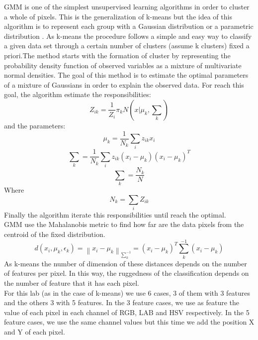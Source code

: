 \documentclass[10pt,twocolumn,letterpaper]{article}
\begin{document}
GMM is one of the simplest unsupervised learning algorithms in order to cluster a whole of pixels. This is the generalization of k-means but the idea of this algorithm is to represent each group with a Gaussian distribution or a parametric distribution \cite{Arbelaez}. As k-means the procedure follows a simple and easy way to classify a given data set through a certain number of clusters (assume k clusters) fixed a priori.The method starts with the formation of cluster by representing the probability density function of observed variables as a mixture of multivariate normal densities. The goal of this method is to estimate the optimal parameters of a mixture of Gaussians in order to explain the observed data. For reach this goal, the algorithm estimate the responsibilities:
\begin{equation} Z_{ik}= \frac{1}{Z_{i}}\pi _{k}N\left ( x|\mu _{k}, \sum _{k}\right ) 
\end{equation}
and the parameters:
\begin{equation} \mu _{k}=\frac{1}{N_{k}}\sum _{i}z_{ik}x_{i}
\end{equation}
\begin{equation}
\sum _{k}=\frac{1}{N_{k}}\sum _{i}z_{ik}\left (  x_{i}-\mu _{k}\right )\left (  x_{i}-\mu _{k}\right )^{T}
\end{equation}
\begin{equation}
\sum _{k}=\frac{N_{k}}{N}
\end{equation}
Where
\begin{equation}
N_{k}=\sum _{i}Z_{ik}
\end{equation}
Finally the algorithm iterate this responsibilities until reach the optimal. \\
GMM use the Mahalanobis metric to find how far are the data pixels from the centroid of the fixed distribution. 
\begin{equation}
d\left ( x_{i},\mu _{k} ,\epsilon _{k}\right) =\left \| x_{i}-\mu _{k} \right \|_{\sum _{k}^{-1}}=\left (  x_{i}-\mu _{k}\right )^{T}\sum _{k}^{-1}\left (  x_{i}-\mu _{k}\right )
\end{equation}
As k-means the number of dimension of these distances depends on the number of features per pixel. In this way,  the ruggedness of the classification depends on the number of feature that it has each pixel.\\
 
For this lab (as in the case of k-means) we use 6 cases, 3 of them with 3 features and the others 3 with 5 features. In the 3 feature cases, we use as feature the value of each pixel in each channel of RGB, LAB and HSV respectively. In the 5 feature cases, we use the same channel values but this time we add the position X and Y of each pixel. 
\end{document}
